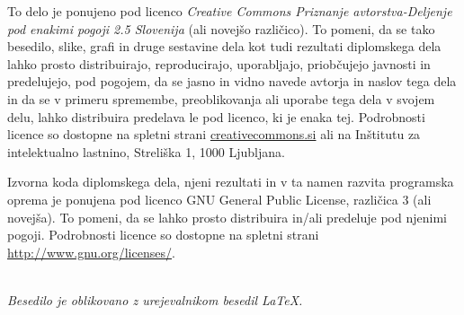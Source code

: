 \newpage
\thispagestyle{empty}

\vspace*{5cm}
{\small \noindent
To delo je ponujeno pod licenco \textit{Creative Commons Priznanje avtorstva-Deljenje pod enakimi pogoji 2.5 Slovenija} (ali novej\v so razli\v cico).
To pomeni, da se tako besedilo, slike, grafi in druge sestavine dela kot tudi rezultati diplomskega dela lahko prosto distribuirajo,
reproducirajo, uporabljajo, priobčujejo javnosti in predelujejo, pod pogojem, da se jasno in vidno navede avtorja in naslov tega
dela in da se v primeru spremembe, preoblikovanja ali uporabe tega dela v svojem delu, lahko distribuira predelava le pod
licenco, ki je enaka tej.
Podrobnosti licence so dostopne na spletni strani \href{http://creativecommons.si}{creativecommons.si} ali na Inštitutu za
intelektualno lastnino, Streliška 1, 1000 Ljubljana.

\vspace*{1cm}
\begin{center}%
\hspace*{1ex}\hspace*{1ex}%
\end{center}
}

\vspace*{1cm}
{\small \noindent
Izvorna koda diplomskega dela, njeni rezultati in v ta namen razvita programska oprema je ponujena pod licenco GNU General Public License,
različica 3 (ali novejša). To pomeni, da se lahko prosto distribuira in/ali predeluje pod njenimi pogoji.
Podrobnosti licence so dostopne na spletni strani \url{http://www.gnu.org/licenses/}.
}

\vfill
\begin{center} 
\ \\ \vfill
{\em
Besedilo je oblikovano z urejevalnikom besedil \LaTeX.}
\end{center}

\clearemptydoublepage



